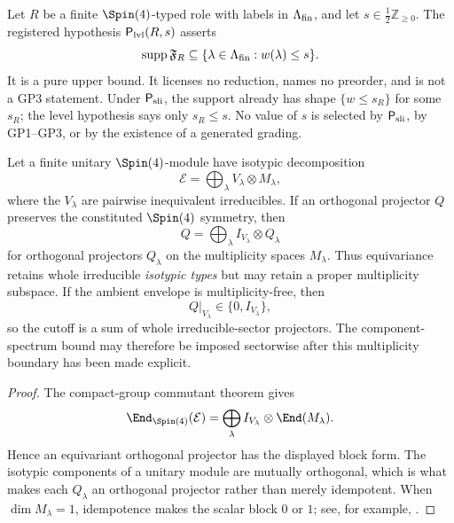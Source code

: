 \documentclass[11pt,a4paper]{article}
\begin{document}
\begin{definition}
\label{p2:def:ceiling-hypothesis}
Let \(R\) be a finite \(\Spin(4)\)-typed role with labels in
\(\Lambda_{\rm fin}\), and let \(s\in\tfrac12\mathbb Z_{\ge0}\).  The
registered hypothesis \(\mathsf P_{\rm lvl}(R,s)\) asserts
\[
 \operatorname{supp}\mathfrak F_R
 \subseteq\{\lambda\in\Lambda_{\rm fin}:w(\lambda)\le s\}.
\]
It is a pure upper bound.  It licenses no reduction, names no preorder, and is
not a GP3 statement.  Under \(\mathsf P_{\rm sli}\), the support already has
shape \(\{w\le s_R\}\) for some \(s_R\); the level hypothesis says only
\(s_R\le s\).  No value of \(s\) is selected by \(\mathsf P_{\rm sli}\), by
GP1--GP3, or by the existence of a generated grading.
\end{definition}

\begin{lemma}
\label{p2:lem:equivariant-truncation-no-insertion}
Let a finite unitary \(\Spin(4)\)-module have isotypic decomposition
\[
 \mathcal E
 =
 \bigoplus_\lambda V_\lambda\otimes M_\lambda ,
\]
where the \(V_\lambda\) are pairwise inequivalent irreducibles.  If an
orthogonal projector \(Q\) preserves the constituted \(\Spin(4)\) symmetry,
then
\[
 Q
 =
 \bigoplus_\lambda I_{V_\lambda}\otimes Q_\lambda
\]
for orthogonal projectors \(Q_\lambda\) on the multiplicity spaces
\(M_\lambda\).  Thus equivariance retains whole irreducible
\emph{isotypic types} but may retain a proper multiplicity subspace.  If the
ambient envelope is multiplicity-free, then
\[
 Q|_{V_\lambda}\in\{0,I_{V_\lambda}\},
\]
so the cutoff is a sum of whole irreducible-sector projectors.  The
component-spectrum bound may therefore be imposed sectorwise after this
multiplicity boundary has been made explicit.
\end{lemma}

\begin{proof}
The compact-group commutant theorem gives
\[
 \End_{\Spin(4)}(\mathcal E)
 =
 \bigoplus_\lambda
 I_{V_\lambda}\otimes\End(M_\lambda).
\]
Hence an equivariant orthogonal projector has the displayed block form.  The
isotypic components of a unitary module are mutually orthogonal, which is what
makes each \(Q_\lambda\) an orthogonal projector rather than merely idempotent.  When
\(\dim M_\lambda=1\), idempotence makes the scalar block \(0\) or \(1\);
see, for example, \cite{fulton1991representation,Hall2015lie}.
\end{proof}
\end{document}
